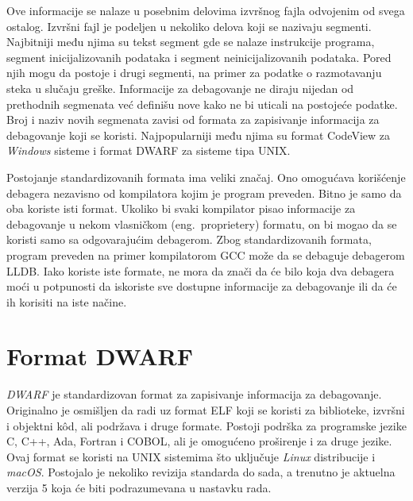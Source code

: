 \documentclass[12pt,oneside]{memoir}
\begin{document}
Ove informacije se nalaze u posebnim delovima izvršnog fajla odvojenim od svega ostalog.
Izvršni fajl je podeljen u nekoliko delova koji se nazivaju segmenti.
Najbitniji među njima su tekst segment gde se nalaze instrukcije programa, segment inicijalizovanih podataka i segment neinicijalizovanih podataka.
Pored njih mogu da postoje i drugi segmenti, na primer za podatke o razmotavanju steka u slučaju greške.
Informacije za debagovanje ne diraju nijedan od prethodnih segmenata već definišu nove kako ne bi uticali na postojeće podatke.
Broj i naziv novih segmenata zavisi od formata za zapisivanje informacija za debagovanje koji se koristi.
Najpopularniji među njima su format CodeView za \textit{Windows} sisteme i format DWARF za sisteme tipa UNIX.

Postojanje standardizovanih formata ima veliki značaj.
Ono omogućava korišćenje debagera nezavisno od kompilatora kojim je program preveden.
Bitno je samo da oba koriste isti format.
Ukoliko bi svaki kompilator pisao informacije za debagovanje u nekom vlasničkom (eng.~{proprietery}) formatu, on bi mogao da se koristi samo sa odgovarajućim debagerom.
Zbog standardizovanih formata, program preveden na primer kompilatorom GCC može da se debaguje debagerom LLDB.
Iako koriste iste formate, ne mora da znači da će bilo koja dva debagera moći u potpunosti da iskoriste sve dostupne informacije za debagovanje ili da će ih korisiti na iste načine.

\section{Format DWARF}
\label{sec:dwarf}


\textit{DWARF} \cite{dwarf5} je standardizovan format za zapisivanje informacija za debagovanje.
Originalno je osmišljen da radi uz format ELF \cite{elf} koji se koristi za biblioteke, izvršni i objektni k\^od, ali podržava i druge formate.
Postoji podrška za programske jezike C, C++, Ada, Fortran i COBOL, ali je omogućeno proširenje i za druge jezike.
Ovaj format se koristi na UNIX sistemima što uključuje \textit{Linux} distribucije i \textit{macOS}.
Postojalo je nekoliko revizija standarda do sada, a trenutno je aktuelna verzija 5 koja će biti podrazumevana u nastavku rada.
\end{document}
